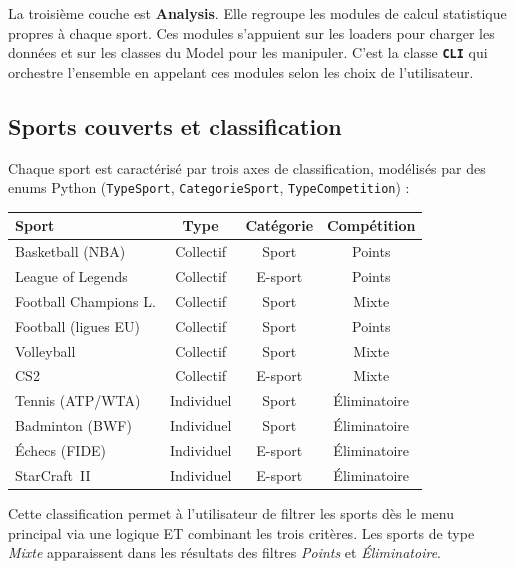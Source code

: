 \documentclass[12pt,a4paper]{article}
\newcommand{\code}[1]{\texttt{#1}}
\newcommand{\classe}[1]{\texttt{\textbf{#1}}}
\begin{document}
La troisième couche est \textbf{Analysis}. Elle regroupe les modules de calcul statistique
propres à chaque sport. Ces modules s'appuient sur les loaders pour charger les données
et sur les classes du Model pour les manipuler. C'est la classe \classe{CLI} qui orchestre
l'ensemble en appelant ces modules selon les choix de l'utilisateur.

\subsection{Sports couverts et classification}

Chaque sport est caractérisé par trois axes de classification, modélisés par des enums
Python (\code{TypeSport}, \code{CategorieSport}, \code{TypeCompetition}) :

\begin{center}
\begin{tabular}{lccc}
  \toprule
  \textbf{Sport} & \textbf{Type} & \textbf{Catégorie} & \textbf{Compétition} \\
  \midrule
  Basketball (NBA)       & Collectif  & Sport   & Points       \\
  League of Legends      & Collectif  & E-sport & Points       \\
  Football Champions L.  & Collectif  & Sport   & Mixte        \\
  Football (ligues EU)   & Collectif  & Sport   & Points       \\
  Volleyball             & Collectif  & Sport   & Mixte        \\
  CS2                    & Collectif  & E-sport & Mixte        \\
  Tennis (ATP/WTA)       & Individuel & Sport   & Éliminatoire \\
  Badminton (BWF)        & Individuel & Sport   & Éliminatoire \\
  Échecs (FIDE)          & Individuel & E-sport & Éliminatoire \\
  StarCraft~II           & Individuel & E-sport & Éliminatoire \\
  \bottomrule
\end{tabular}
\end{center}

Cette classification permet à l'utilisateur de filtrer les sports dès le menu principal via une
logique ET combinant les trois critères. Les sports de type \textit{Mixte} apparaissent dans les
résultats des filtres \textit{Points} et \textit{Éliminatoire}.
\end{document}
